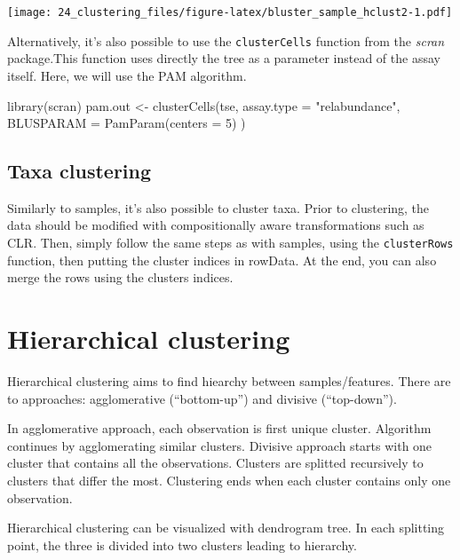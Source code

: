 \documentclass[
]{book}
\newenvironment{Shaded}{\begin{snugshade}}{\end{snugshade}}
\newcommand{\AttributeTok}[1]{\textcolor[rgb]{0.77,0.63,0.00}{#1}}
\newcommand{\DecValTok}[1]{\textcolor[rgb]{0.00,0.00,0.81}{#1}}
\newcommand{\FunctionTok}[1]{\textcolor[rgb]{0.00,0.00,0.00}{#1}}
\newcommand{\NormalTok}[1]{#1}
\newcommand{\OtherTok}[1]{\textcolor[rgb]{0.56,0.35,0.01}{#1}}
\newcommand{\StringTok}[1]{\textcolor[rgb]{0.31,0.60,0.02}{#1}}
\begin{document}
\texttt{[image: 24\_clustering\_files/figure-latex/bluster\_sample\_hclust2-1.pdf]}

Alternatively, it's also possible to use the \texttt{clusterCells} function from
the \emph{scran} package.This function uses directly the tree as a parameter
instead of the assay itself. Here, we will use the PAM algorithm.

\begin{Shaded}
\begin{Highlighting}[]
\FunctionTok{library}\NormalTok{(scran)}
\NormalTok{pam.out }\OtherTok{\textless{}{-}} \FunctionTok{clusterCells}\NormalTok{(tse,}
  \AttributeTok{assay.type =} \StringTok{"relabundance"}\NormalTok{,}
  \AttributeTok{BLUSPARAM =} \FunctionTok{PamParam}\NormalTok{(}\AttributeTok{centers =} \DecValTok{5}\NormalTok{)}
\NormalTok{)}
\end{Highlighting}
\end{Shaded}

\hypertarget{taxa-clustering}{%
\subsection{Taxa clustering}\label{taxa-clustering}}

Similarly to samples, it's also possible to cluster taxa.
Prior to clustering, the data should be modified with compositionally
aware transformations such as CLR. Then, simply follow the same steps as
with samples, using the \texttt{clusterRows} function, then putting the cluster
indices in rowData. At the end, you can also merge the rows using the
clusters indices.

\hypertarget{hierarchical-clustering}{%
\section{Hierarchical clustering}\label{hierarchical-clustering}}

Hierarchical clustering aims to find hiearchy between
samples/features. There are to approaches: agglomerative (``bottom-up'')
and divisive (``top-down'').

In agglomerative approach, each observation is first unique cluster.
Algorithm continues by agglomerating similar clusters. Divisive
approach starts with one cluster that contains all the
observations. Clusters are splitted recursively to clusters that
differ the most. Clustering ends when each cluster contains only one
observation.

Hierarchical clustering can be visualized with dendrogram tree. In each
splitting point, the three is divided into two clusters leading to
hierarchy.
\end{document}
